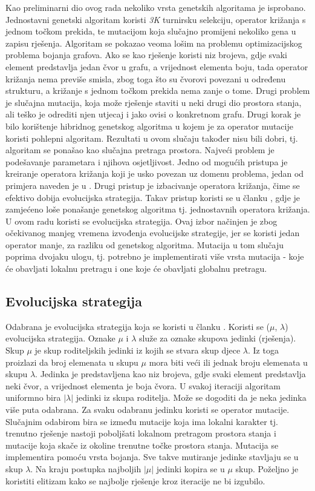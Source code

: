 \documentclass[times, utf8, diplomski, numeric]{fer}
\begin{document}
Kao preliminarni dio ovog rada nekoliko vrsta genetskih algoritama je isprobano. Jednostavni genetski algoritam koristi \emph{3K} turnirsku selekciju, operator križanja s jednom točkom prekida, te mutacijom koja slučajno promijeni nekoliko gena u zapisu rješenja. Algoritam se pokazao veoma lošim na problemu optimizacijskog problema bojanja grafova. Ako se kao rješenje koristi niz brojeva, gdje svaki element predstavlja jedan čvor u grafu, a vrijednost elementa boju, tada operator križanja nema previše smisla, zbog toga što su čvorovi povezani u određenu strukturu, a križanje s jednom točkom prekida nema zanje o tome. Drugi problem je slučajna mutacija, koja može rješenje staviti u neki drugi dio prostora stanja, ali teško je odrediti njen utjecaj i jako ovisi o konkretnom grafu. Drugi korak je bilo korištenje hibridnog genetskog algoritma u kojem je za operator mutacije koristi pohlepni algoritam. Rezultati u ovom slučaju također nisu bili dobri, tj. algoritam se ponašao kao slučajna pretraga prostora. Najveći problem je podešavanje parametara i njihova osjetljivost. Jedno od mogućih pristupa je kreiranje operatora križanja koji je usko povezan uz domenu problema, jedan od primjera naveden je u \cite{lit17}. Drugi pristup je izbacivanje operatora križanja, čime se efektivo dobija evolucijska strategija. Takav pristup koristi se u članku \cite{lit12}, gdje je zamjećeno loše ponašanje genetskog algoritma tj. jednostavnih operatora križanja. U ovom radu koristi se evolucijska strategija. Ovaj izbor načinjen je zbog očekivanog manjeg vremena izvođenja evolucijske strategije, jer se koristi jedan operator manje, za razliku od genetskog algoritma. Mutacija u tom slučaju poprima dvojaku ulogu, tj. potrebno je implementirati više vrsta mutacija - koje će obavljati lokalnu pretragu i one koje će obavljati globalnu pretragu.

\subsection{Evolucijska strategija}

Odabrana je evolucijska strategija koja se koristi u članku \cite{lit17}. Koristi se ($\mu$, $\lambda$) evolucijska strategija. Oznake $\mu$ i $\lambda$ služe za oznake skupova jedinki (rješenja). Skup $\mu$ je skup roditeljskih jedinki iz kojih se stvara skup djece $\lambda$. Iz toga proizlazi da broj elemenata u skupu $\mu$ mora biti veći ili jednak broju elemenata u skupu $\lambda$. Jedinka je predstavljena kao niz brojeva, gdje svaki element predstavlja neki čvor, a vrijednost elementa je boja čvora. U svakoj iteraciji algoritam uniformno bira $|\lambda|$ jedinki iz skupa roditelja. Može se dogoditi da je neka jedinka više puta odabrana. Za svaku odabranu jedinku koristi se operator mutacije. Slučajnim odabirom bira se između mutacije koja ima lokalni karakter tj. trenutno rješenje nastoji poboljšati lokalnom pretragom prostora stanja i mutacije koja skače iz okoline trenutne točke prostora stanja. Mutacija se implementira pomoću vrsta bojanja. Sve takve mutiranje jedinke stavljaju se u skup $\lambda$. Na kraju postupka najboljih $|\mu|$ jedinki kopira se u $\mu$ skup. Poželjno je koristiti elitizam kako se najbolje rješenje kroz iteracije ne bi izgubilo.
\end{document}

